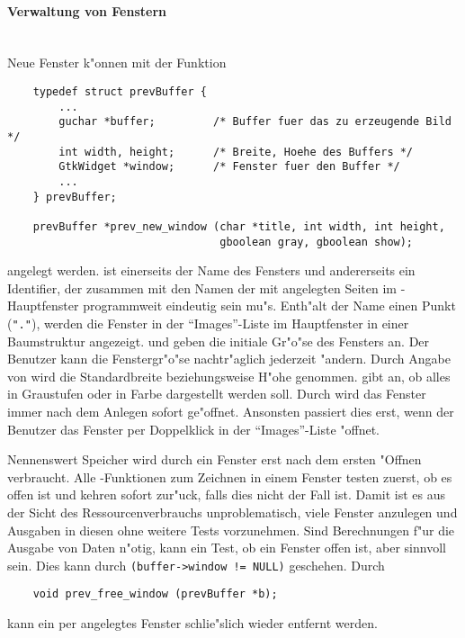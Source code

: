 \paragraph{Verwaltung von Fenstern}\hfill\\

Neue Fenster k"onnen mit der Funktion
\begin{small}
\linespread{0.9}
\begin{verbatim}
    typedef struct prevBuffer {
        ...
        guchar *buffer;         /* Buffer fuer das zu erzeugende Bild */
        int width, height;      /* Breite, Hoehe des Buffers */
        GtkWidget *window;      /* Fenster fuer den Buffer */
        ...
    } prevBuffer;

    prevBuffer *prev_new_window (char *title, int width, int height,
                                 gboolean gray, gboolean show);
\end{verbatim}
\end{small}
angelegt werden.  ist einerseits der Name des Fensters
und andererseits ein Identifier, der zusammen mit den Namen der mit
 angelegten Seiten im
\icewing-Hauptfenster programmweit eindeutig sein mu"s. Enth"alt der
Name einen Punkt (\verb|"."|), werden die Fenster in der
``Images''-Liste im Hauptfenster in einer Baumstruktur
angezeigt.  und  geben die initiale Gr"o"se
des Fensters an. Der Benutzer kann die Fenstergr"o"se nachtr"aglich
jederzeit "andern. Durch Angabe von  wird die Standardbreite
beziehungsweise H"ohe genommen.  gibt an, ob alles in
Graustufen oder in Farbe dargestellt werden soll. Durch  wird das Fenster immer nach dem Anlegen sofort
ge"offnet. Ansonsten passiert dies erst, wenn der Benutzer das
Fenster per Doppelklick in der ``Images''-Liste "offnet.

Nennenswert Speicher wird durch ein Fenster erst nach dem ersten
"Offnen verbraucht. Alle \icewing-Funktionen zum Zeichnen in einem
Fenster testen zuerst, ob es offen ist und kehren sofort zur"uck,
falls dies nicht der Fall ist. Damit ist es aus der Sicht des
Ressourcenverbrauchs unproblematisch, viele Fenster anzulegen und
Ausgaben in diesen ohne weitere Tests vorzunehmen. Sind Berechnungen
f"ur die Ausgabe von Daten n"otig, kann ein Test, ob ein Fenster
offen ist, aber sinnvoll sein. Dies kann durch
\verb|(buffer->window != NULL)| geschehen. Durch
\begin{small}
\linespread{0.9}
\begin{verbatim}
    void prev_free_window (prevBuffer *b);
\end{verbatim}
\end{small}
kann ein per  angelegtes Fenster
schlie"slich wieder entfernt werden.

